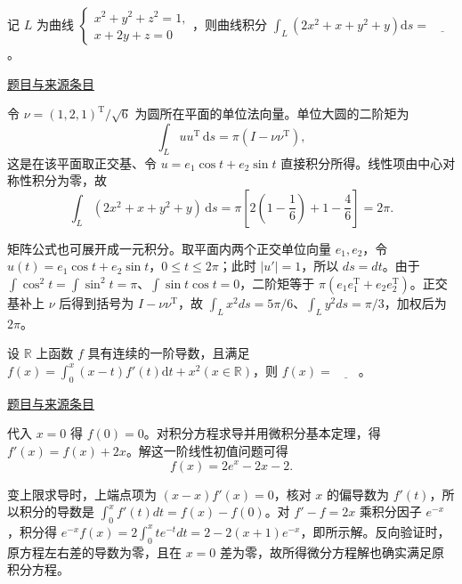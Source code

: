 \documentclass[UTF8,12pt,a4paper,fontset=fandol]{ctexart}
\begin{document}
\begin{example}[来源序号2]\label{ex:fin14-high:2}\label{pr:fin14-high:2}

记 $L$ 为曲线 $\begin{cases} x^2+y^2+z^2=1, \\ x+2y+z=0 \end{cases}$，则曲线积分 $\int_L \left(2x^2+x+y^2+y\right) \mathrm{d} s=$$\underline{\qquad}$。

\par\href{https://github.com/lzxcr/cmc-mathematics/blob/64916fa1fdbc3e444a652eca204d5669058ee321/src/problems/finals/14/02.md}{题目与来源条目}

\end{example}

\begin{solve}\label{ans:fin14-high:2}

令 $\nu=(1,2,1)^{\mathrm T}/\sqrt6$ 为圆所在平面的单位法向量。单位大圆的二阶矩为
\[
\int_L uu^{\mathrm T}\,\mathrm ds=\pi(I-\nu\nu^{\mathrm T}),
\]
这是在该平面取正交基、令 $u=e_1\cos t+e_2\sin t$ 直接积分所得。线性项由中心对称性积分为零，故
\[
\int_L(2x^2+x+y^2+y)\,\mathrm ds
=\pi\left[2\left(1-\frac16\right)+1-\frac46\right]=\boxed{2\pi}.
\]

矩阵公式也可展开成一元积分。取平面内两个正交单位向量 $e_1,e_2$，令 $u(t)=e_1\cos t+e_2\sin t$，$0\le t\le2\pi$；此时 $|u'|=1$，所以 $ds=dt$。由于 $\int\cos^2t=\int\sin^2t=\pi$、$\int\sin t\cos t=0$，二阶矩等于 $\pi(e_1e_1^{\mathrm T}+e_2e_2^{\mathrm T})$。正交基补上 $\nu$ 后得到括号为 $I-\nu\nu^{\mathrm T}$，故 $\int_Lx^2ds=5\pi/6$、$\int_Ly^2ds=\pi/3$，加权后为 $2\pi$。

\end{solve}

\begin{example}[来源序号4]\label{ex:fin14-high:4}\label{pr:fin14-high:4}

设 $\mathbb{R}$ 上函数 $f$ 具有连续的一阶导数，且满足 $f(x)=\int_0^x (x-t)f'(t) \mathrm{d} t+x^2(x \in \mathbb{R})$，则 $f(x)=$$\underline{\qquad}$。

\par\href{https://github.com/lzxcr/cmc-mathematics/blob/64916fa1fdbc3e444a652eca204d5669058ee321/src/problems/finals/14/04.md}{题目与来源条目}

\end{example}

\begin{solve}\label{ans:fin14-high:4}

代入 $x=0$ 得 $f(0)=0$。对积分方程求导并用微积分基本定理，得 $f'(x)=f(x)+2x$。解这一阶线性初值问题可得
\[
\boxed{f(x)=2e^x-2x-2}.
\]

变上限求导时，上端点项为 $(x-x)f'(x)=0$，核对 $x$ 的偏导数为 $f'(t)$，所以积分的导数是 $\int_0^xf'(t)dt=f(x)-f(0)$。对 $f'-f=2x$ 乘积分因子 $e^{-x}$，积分得 $e^{-x}f(x)=2\int_0^xte^{-t}dt=2-2(x+1)e^{-x}$，即所示解。反向验证时，原方程左右差的导数为零，且在 $x=0$ 差为零，故所得微分方程解也确实满足原积分方程。

\end{solve}
\end{document}
